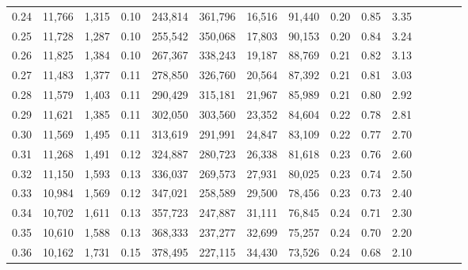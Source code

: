 \begin{tabular}{rrrcrrrrrrrrrrr}
0.24 &  11,766 &  1,315 &                                       0.10 &  243,814 &  361,796 &   16,516 &   91,440 &  0.20 &  0.85 &                         3.35 \\
0.25 &  11,728 &  1,287 &                                       0.10 &  255,542 &  350,068 &   17,803 &   90,153 &  0.20 &  0.84 &                         3.24 \\
0.26 &  11,825 &  1,384 &                                       0.10 &  267,367 &  338,243 &   19,187 &   88,769 &  0.21 &  0.82 &                         3.13 \\
0.27 &  11,483 &  1,377 &                                       0.11 &  278,850 &  326,760 &   20,564 &   87,392 &  0.21 &  0.81 &                         3.03 \\
0.28 &  11,579 &  1,403 &                                       0.11 &  290,429 &  315,181 &   21,967 &   85,989 &  0.21 &  0.80 &                         2.92 \\
0.29 &  11,621 &  1,385 &                                       0.11 &  302,050 &  303,560 &   23,352 &   84,604 &  0.22 &  0.78 &                         2.81 \\
0.30 &  11,569 &  1,495 &                                       0.11 &  313,619 &  291,991 &   24,847 &   83,109 &  0.22 &  0.77 &                         2.70 \\
0.31 &  11,268 &  1,491 &                                       0.12 &  324,887 &  280,723 &   26,338 &   81,618 &  0.23 &  0.76 &                         2.60 \\
0.32 &  11,150 &  1,593 &                                       0.13 &  336,037 &  269,573 &   27,931 &   80,025 &  0.23 &  0.74 &                         2.50 \\
0.33 &  10,984 &  1,569 &                                       0.12 &  347,021 &  258,589 &   29,500 &   78,456 &  0.23 &  0.73 &                         2.40 \\
0.34 &  10,702 &  1,611 &                                       0.13 &  357,723 &  247,887 &   31,111 &   76,845 &  0.24 &  0.71 &                         2.30 \\
0.35 &  10,610 &  1,588 &                                       0.13 &  368,333 &  237,277 &   32,699 &   75,257 &  0.24 &  0.70 &                         2.20 \\
0.36 &  10,162 &  1,731 &                                       0.15 &  378,495 &  227,115 &   34,430 &   73,526 &  0.24 &  0.68 &                         2.10 \\

\end{tabular}
